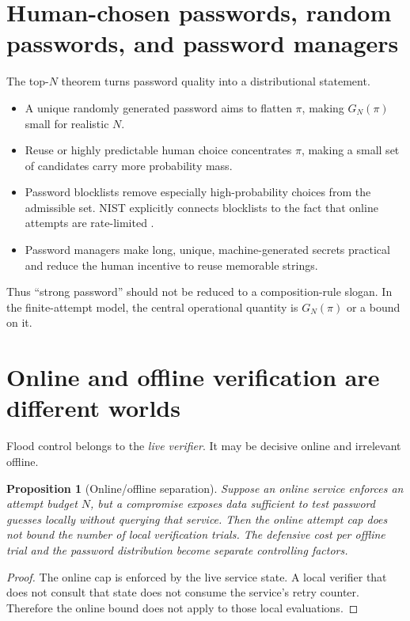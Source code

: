 \documentclass[11pt,openany]{book}
\newtheorem{proposition}[theorem]{Proposition}
\theoremstyle{definition}
\theoremstyle{remark}
\begin{document}
\section{Human-chosen passwords, random passwords, and password managers}
The top-$N$ theorem turns password quality into a distributional statement.
\begin{itemize}
\item A unique randomly generated password aims to flatten $\pi$, making $G_N(\pi)$ small for realistic $N$.
\item Reuse or highly predictable human choice concentrates $\pi$, making a small set of candidates carry more probability mass.
\item Password blocklists remove especially high-probability choices from the admissible set. NIST explicitly connects blocklists to the fact that online attempts are rate-limited \cite{NIST80063B4}.
\item Password managers make long, unique, machine-generated secrets practical and reduce the human incentive to reuse memorable strings.
\end{itemize}
Thus ``strong password'' should not be reduced to a composition-rule slogan. In the finite-attempt model, the central operational quantity is $G_N(\pi)$ or a bound on it.

\section{Online and offline verification are different worlds}
Flood control belongs to the \emph{live verifier}. It may be decisive online and irrelevant offline.

\begin{proposition}[Online/offline separation]\label{prop:onlineoffline}
Suppose an online service enforces an attempt budget $N$, but a compromise exposes data sufficient to test password guesses locally without querying that service. Then the online attempt cap does not bound the number of local verification trials. The defensive cost per offline trial and the password distribution become separate controlling factors.
\end{proposition}
\begin{proof}
The online cap is enforced by the live service state. A local verifier that does not consult that state does not consume the service's retry counter. Therefore the online bound does not apply to those local evaluations.
\end{proof}
\end{document}
